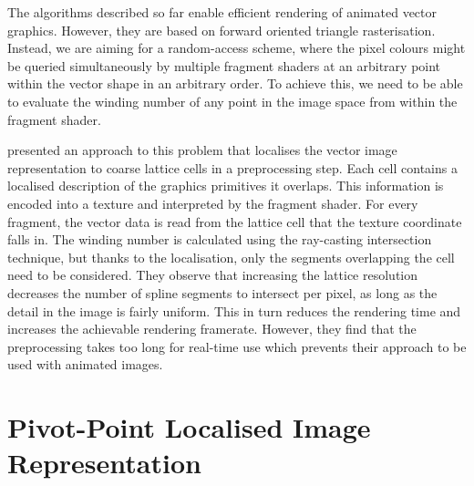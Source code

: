 \documentclass[11pt,a4paper,twoside]{article}
\begin{document}
The algorithms described so far enable efficient rendering of animated vector graphics. However, they are based on forward oriented triangle rasterisation. Instead, we are aiming for a random-access scheme, where the pixel colours might be queried simultaneously by multiple fragment shaders at an arbitrary point within the vector shape in an arbitrary order. To achieve this, we need to be able to evaluate the winding number of any point in the image space from within the fragment shader.

\cite{NehabHoppe08} presented an approach to this problem that localises the vector image representation to coarse lattice cells in a preprocessing step. Each cell contains a localised description of the graphics primitives it overlaps. This information is encoded into a texture and interpreted by the fragment shader. For every fragment, the vector data is read from the lattice cell that the texture coordinate falls in. The winding number is calculated using the ray-casting intersection technique, but thanks to the localisation, only the segments overlapping the cell need to be considered. They observe that increasing the lattice resolution decreases the number of spline segments to intersect per pixel, as long as the detail in the image is fairly uniform. This in turn reduces the rendering time and increases the achievable rendering framerate. However, they find that the preprocessing takes too long for real-time use which prevents their approach to be used with animated images.

\section {Pivot-Point Localised Image Representation}
\end{document}
